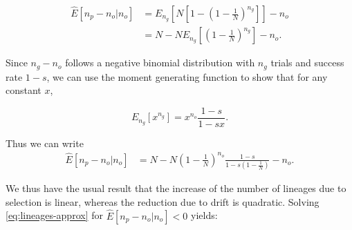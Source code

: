\documentclass[review]{elsarticle}
\begin{document}
\begin{equation*}
  \begin{aligned}
    \label{eq:lineages-approx}
    \hat{E}[n_p -n_o | n_o] & =   E_{n_g}\left[N\left[1-\left( 1 - \frac{1}{N} \right)^{n_g} \right]\right]- n_o\\
    & =   N-N  E_{n_g}\left[\left( 1 - \frac{1}{N} \right)^{n_g} \right] -n_o. 
  \end{aligned}
\end{equation*}

Since $n_g-n_o$ follows a negative binomial distribution with $n_g$ trials and success rate $1-s$, we can use the moment generating function to show that for any constant $x$,

\begin{equation}
E_{n_g}[x^{n_g}] = x^{n_o}  \frac{1-s}{1-sx}.
\label{eq:identity}
\end{equation} 

Thus we can write 
\begin{equation*}
  \begin{aligned}
    \label{eq:lineages-approx}
    \hat{E}[n_p -n_o | n_o]    & =   N-N  \left( 1 - \frac{1}{N} \right)^{n_o} \frac{1-s}{1-s \left( 1 - \frac{1}{N} \right)}     -n_o.
  \end{aligned}
\end{equation*}









We thus have the usual result that the increase of the number of lineages due to selection is
linear, whereas the reduction due to drift is quadratic. Solving \eqref{eq:lineages-approx} for $ \hat{E}[n_p -n_o | n_o]<0$ yields:
\end{document}
